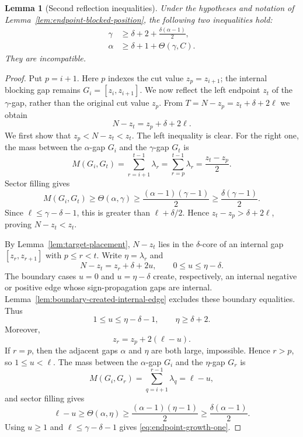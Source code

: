 \documentclass[11pt]{article}
\newtheorem{lemma}[theorem]{Lemma}
\begin{document}
\begin{lemma}[Second reflection inequalities]\label{lem:endpoint-blocked-growth}
Under the hypotheses and notation of Lemma~\ref{lem:endpoint-blocked-position}, the following two inequalities hold:
\begin{align}
        \gamma&\ge \delta+2+\frac{\delta(\alpha-1)}2,
        \label{eq:endpoint-growth-one}\\
        \alpha&\ge \delta+1+\Theta(\gamma,C).
        \label{eq:endpoint-growth-two}
\end{align}
They are incompatible.
\end{lemma}

\begin{proof}
Put $p=i+1$.  Here $p$ indexes the cut value $z_p=z_{i+1}$; the internal blocking gap remains $G_i=[z_i,z_{i+1}]$.  We now reflect the left endpoint $z_t$ of the $\gamma$-gap, rather than the original cut value $z_p$.  From $T=N-z_p=z_t+\delta+2\ell$ we obtain
\[
        N-z_t=z_p+\delta+2\ell.
\]
We first show that $z_p<N-z_t<z_t$.  The left inequality is clear.  For the right one, the mass between the $\alpha$-gap $G_i$ and the $\gamma$-gap $G_t$ is
\[
        M(G_i,G_t)=\sum_{r=i+1}^{t-1}\lambda_r=\sum_{r=p}^{t-1}\lambda_r=\frac{z_t-z_p}{2}.
\]
Sector filling gives
\[
        M(G_i,G_t)
        \ge \Theta(\alpha,\gamma)
        \ge \frac{(\alpha-1)(\gamma-1)}2
        \ge \frac{\delta(\gamma-1)}2.
\]
Since $\ell\le\gamma-\delta-1$, this is greater than $\ell+\delta/2$.  Hence $z_t-z_p>\delta+2\ell$, proving $N-z_t<z_t$.

By Lemma~\ref{lem:target-placement}, $N-z_t$ lies in the $\delta$-core of an internal gap $[z_r,z_{r+1}]$ with $p\le r<t$.  Write $\eta=\lambda_r$ and
\[
        N-z_t=z_r+\delta+2u,
        \qquad
        0\le u\le \eta-\delta.
\]
The boundary cases $u=0$ and $u=\eta-\delta$ create, respectively, an internal negative or positive edge whose sign-propagation gaps are internal.  Lemma~\ref{lem:boundary-created-internal-edge} excludes these boundary equalities.  Thus
\[
        1\le u\le\eta-\delta-1,
        \qquad
        \eta\ge\delta+2.
\]
Moreover,
\[
        z_r=z_p+2(\ell-u).
\]
If $r=p$, then the adjacent gaps $\alpha$ and $\eta$ are both large, impossible.  Hence $r>p$, so $1\le u<\ell$.  The mass between the $\alpha$-gap $G_i$ and the $\eta$-gap $G_r$ is
\[
        M(G_i,G_r)=\sum_{q=i+1}^{r-1}\lambda_q=\ell-u,
\]
and sector filling gives
\[
        \ell-u\ge\Theta(\alpha,\eta)
        \ge\frac{(\alpha-1)(\eta-1)}2
        \ge\frac{\delta(\alpha-1)}2.
\]
Using $u\ge1$ and $\ell\le\gamma-\delta-1$ gives \eqref{eq:endpoint-growth-one}.


\end{proof}
\end{document}
